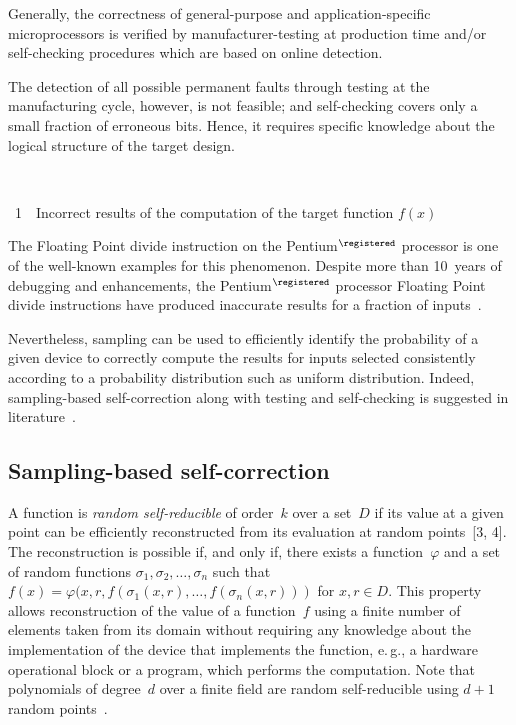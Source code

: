 \begin{multicols}{2}
    Generally, the correctness of general-purpose and application-specific 
    microprocessors is verified by manufacturer-testing 
    at production time and/or self-checking procedures which are 
    based on online detection.
    
     The detection of all possible permanent faults through testing at the manufacturing cycle, however, is not feasible; 
and self-checking covers only a small fraction of erroneous bits. Hence, it requires specific knowledge about the logical 
structure of the target design. 

\begin{center}  %
\vspace*{6pt}
\mbox{%
 \epsfxsize=40mm
 }
  \end{center}
 \vspace*{6pt}
{{\figurename~1}\ \ \small{Incorrect results of the computation of the target function $f(x)$}}



\addtocounter{figure}{1}


The Floating Point divide instruction on the Pentium$^\registered$ processor 
is one of the well-known 
examples for this phenomenon. Despite more than
 10~years of debugging and enhancements, the Pentium$^\registered$ 
processor Floating Point divide instructions have produced inaccurate results for a fraction of 
inputs~\cite{5-dol}.
    
    Nevertheless, sampling can be used to efficiently identify the probability of a given device to correctly compute the 
results for inputs selected consistently according to a probability distribution such as uniform distribution. Indeed, 
sampling-based self-correction along with testing and self-checking is suggested in 
literature~\cite{3-dol, 4-dol}.

\subsection{Sampling-based self-correction}

\noindent
     A function is \textit{random self-reducible} of order~$k$ over a set~$D$ if its value at a given point can be 
efficiently reconstructed from its evaluation at   random points~[3, 4]. The reconstruction is possible if, and only if, 
there exists a function~$\varphi$ and a set of random functions $\sigma_1, \sigma_2,\ldots , \sigma_n$ such that 
$f(x)=\varphi(x,r,f(\sigma_1(x,r),\ldots , f(\sigma_n(x,r)))$ for $x,r\in D$. This property allows reconstruction of the 
value of a function~$f$ using a finite number of elements taken from its domain without requiring any knowledge about 
the implementation of the device that implements the function, e.\,g., a hardware operational block or a program, which 
performs the computation. Note that polynomials of degree~$d$ over a finite field are random self-reducible using 
$d+1$ random points~\cite{4-dol}.
     

\end{multicols}
